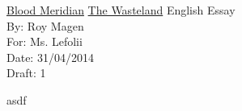 \documentclass[12pt]{article}
\begin{document}
	\begin{titlepage}
		\noindent \uline{Blood Meridian} \uline{The Wasteland} English Essay \\
		By: Roy Magen \\
		For:  Ms. Lefolii \\
		Date: 31/04/2014 \\
		Draft: 1
	\end{titlepage}

asdf
\end{document}
